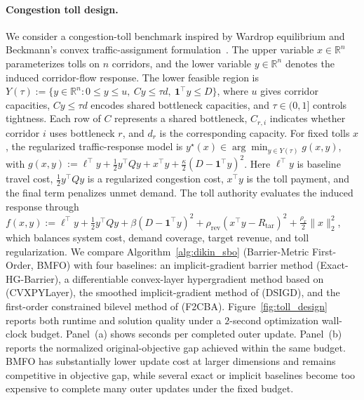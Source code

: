\documentclass{article}
\begin{document}
\paragraph{Congestion toll design.}
We consider a congestion-toll benchmark inspired by Wardrop equilibrium and Beckmann's
convex traffic-assignment formulation~\citep{wardrop1952road,beckmann1956studies}. The upper variable \(x\in\mathbb R^n\) parameterizes tolls on \(n\) corridors, and the lower variable \(y\in\mathbb R^n\)
denotes the induced corridor-flow response. The lower feasible region is
\(Y(\tau):=\{y\in\mathbb R^n:0\le y\le u,\ Cy\le \tau d,\ \mathbf 1^\top y\le D\}\), where \(u\)
gives corridor capacities, \(Cy\le \tau d\) encodes shared bottleneck capacities, and
\(\tau\in(0,1]\) controls tightness. Each row of \(C\) represents a shared bottleneck, \(C_{r,i}\) indicates whether corridor \(i\) uses
bottleneck \(r\), and \(d_r\) is the corresponding capacity. For fixed tolls \(x\), the regularized traffic-response model is
\(y^\star(x)\in\arg\min_{y\in Y(\tau)} g(x,y)\), with
\(g(x,y):=\ell^\top y+\frac12 y^\top Qy+x^\top y+\frac{\kappa}{2}(D-\mathbf 1^\top y)^2\).
Here \(\ell^\top y\) is baseline travel cost, \(\frac12y^\top Qy\) is a regularized congestion cost,
\(x^\top y\) is the toll payment, and the final term penalizes unmet demand. The toll authority
evaluates the induced response through
\(f(x,y):=\ell^\top y+\frac12y^\top Qy+\beta(D-\mathbf 1^\top y)^2
+\rho_{\mathrm{rev}}(x^\top y-R_{\mathrm{tar}})^2+\frac{\rho_x}{2}\|x\|_2^2\),
which balances system cost, demand coverage, target revenue, and toll regularization. We compare Algorithm~\ref{alg:dikin_sbo} (Barrier-Metric First-Order, BMFO) with four
baselines: an implicit-gradient barrier method (Exact-HG-Barrier), a differentiable convex-layer
hypergradient method based on \citet{agrawal2019differentiable} (CVXPYLayer), the smoothed
implicit-gradient method of \citet{khanduri2023linearly} (DSIGD), and the first-order constrained
bilevel method of \citet{kornowski2024first} (F2CBA). Figure~\ref{fig:toll_design} reports both
runtime and solution quality under a \(2\)-second optimization wall-clock budget. Panel~(a) shows
seconds per completed outer update. Panel~(b) reports the normalized
original-objective gap achieved within the same budget. BMFO has substantially lower update cost
at larger dimensions and remains competitive in objective gap, while several exact or implicit
baselines become too expensive to complete many outer updates under the fixed budget.
\end{document}
